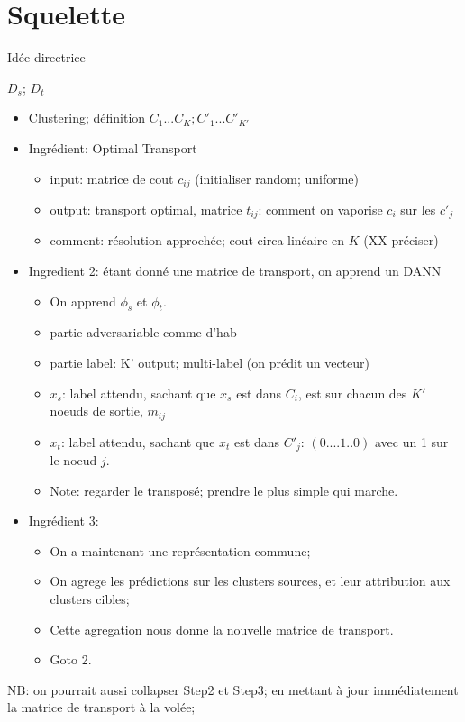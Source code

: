 \chapter{Squelette}

\TODO Idée directrice


$D_s$; $D_t$

\begin{itemize}
\item Clustering; définition $C_1...C_K; C'_1...C'_{K'}$
\item Ingrédient: Optimal Transport
	\begin{itemize}
	\item input: matrice de cout $c_{ij}$ (initialiser random; uniforme)
	\item output: transport optimal, matrice $t_{ij}$: comment on vaporise $c_i$ sur les $c'_j$ 
	\item comment: résolution approchée; cout circa linéaire en $K$ (XX préciser)
	\end{itemize}
\item Ingredient 2: étant donné une matrice de transport, on apprend un DANN
	\begin{itemize}
	\item On apprend $\phi_s$ et $\phi_t$.
	\item partie adversariable comme d'hab
	\item partie label: K' output; multi-label (on prédit un vecteur)
	\item $x_s$: label attendu, sachant que $x_s$ est dans $C_i$, est sur chacun des $K'$ noeuds de sortie, $m_{ij}$
	\item $x_t$: label attendu, sachant que $x_t$ est dans $C'_j$: $(0....1..0)$ avec un 1 sur le noeud $j$.
	\item Note: regarder le transposé; prendre le plus simple qui marche.
	\end{itemize}
\item Ingrédient 3: 
	\begin{itemize}
	\item On a maintenant une représentation commune; 
	\item On agrege les prédictions sur les clusters sources, et leur attribution aux clusters cibles;
	\item Cette agregation nous donne la nouvelle matrice de transport.
	\item Goto 2.
	\end{itemize}
\end{itemize}
NB: on pourrait aussi collapser Step2 et Step3; en mettant à jour immédiatement la matrice de transport à la volée;

